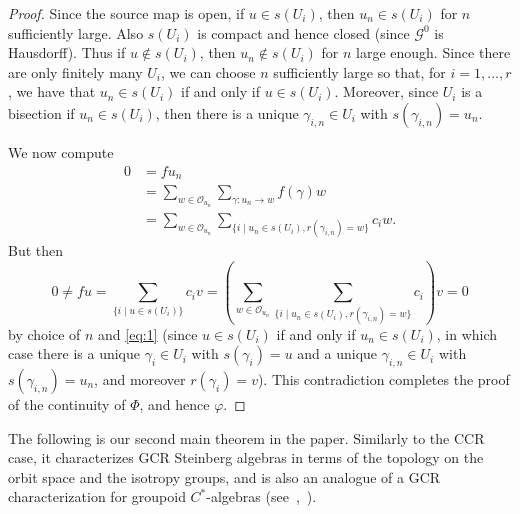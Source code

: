 \documentclass[11pt,reqno]{amsart}
\theoremstyle{plain}
\numberwithin{equation}{section}
\newcommand{\orb}[0]{\mathcal{O}}
\begin{document}
\begin{proof}
 Since the source map is open, if $u\in s(U_i)$, then $u_n\in s(U_i)$ for $n$ sufficiently large. Also $s(U_i)$ is compact and hence closed (since $\mathscr G^0$ is Hausdorff).   Thus if $u\notin s(U_i)$, then $u_n\notin s(U_i)$ for $n$ large enough.  Since there are only finitely many $U_i$, we can choose $n$ sufficiently large so that, for $i=1,\ldots, r$, we have that $u_n\in s(U_i)$ if and only if $u\in s(U_i)$.    Moreover, since $U_i$ is a bisection if $u_n\in s(U_i)$, then there is a unique $\gamma_{i,n}\in U_i$ with $s(\gamma_{i,n})=u_n$.

 We now compute
 \begin{equation}\label{eq:1}
 \begin{split}
 0&=fu_n\\
 &=\sum_{w\in \orb_{u_n}} \sum_{\gamma\colon u_n\to w} f(\gamma)w\\
  &=\sum_{w\in \orb_{u_n}}\sum_{\{i\mid u_n\in s(U_i), r(\gamma_{i,n})=w\}}c_iw.
\end{split}
\end{equation}
But then
\[0\neq fu =\sum_{\{i\mid u\in s(U_i)\}}c_iv =   \left(\sum_{w\in \orb_{u_n}}\sum_{\{i\mid u_n\in s(U_i), r(\gamma_{i,n})=w\}}c_i\right)v=0\]
by choice of $n$ and \eqref{eq:1} (since $u\in s(U_i)$ if and only if $u_n\in s(U_i)$, in which case there is a unique $\gamma_i\in U_i$ with $s(\gamma_i)=u$ and a unique $\gamma_{i,n}\in U_i$ with $s(\gamma_{i,n})=u_n$, and moreover $r(\gamma_i)=v$).  This contradiction completes the proof of the continuity of $\Phi$, and hence $\varphi$.
\end{proof}




The following is our second main theorem in the paper. Similarly to the CCR case,  it characterizes GCR Steinberg algebras in terms of the topology on the orbit space and the isotropy groups, and is also an analogue of a  GCR characterization for groupoid $C^*$-algebras
(see~\cite[Theorem 7.1]{Cl07},~\cite[Theorem 4.3]{vW18}).
\end{document}
